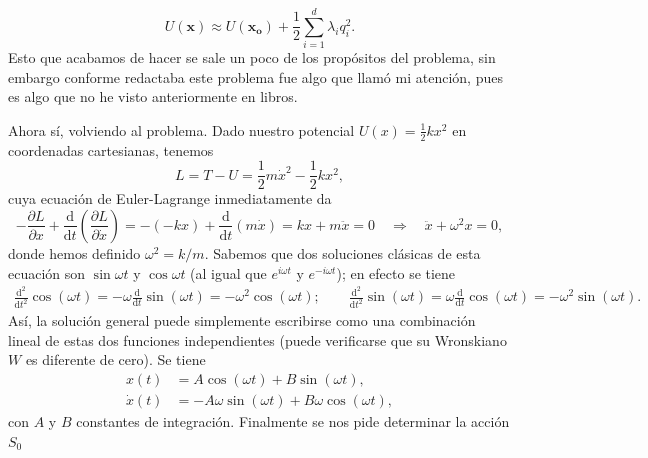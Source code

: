\documentclass{article}
\begin{document}
\begin{equation}
    U(\mathbf{x}) \approx U(\mathbf{x_o}) + \frac{1}{2}\sum_{i=1}^{d} \lambda_i q_i^2.
\end{equation}
Esto que acabamos de hacer se sale un poco de los prop\'ositos del problema, sin embargo conforme redactaba este problema fue algo que llam\'o mi atenci\'on, pues es algo que no he visto anteriormente en libros.

Ahora s\'i, volviendo al problema. Dado nuestro potencial $U(x)=\frac{1}{2}kx^2$ en coordenadas cartesianas, tenemos
\begin{equation}
    L = T-U = \frac{1}{2}m\dot{x}^2-\frac{1}{2}kx^2,
\end{equation}
cuya ecuaci\'on de Euler-Lagrange inmediatamente da
\begin{equation}
    -\frac{\partial L}{\partial x} + \frac{\mathrm{d}}{\mathrm{d}t}\left(\frac{\partial L}{\partial \dot{x}}\right) = -\left(-kx\right)+\frac{\mathrm{d}}{\mathrm{d}t}\left(m\dot{x}\right) = kx+m\ddot{x} = 0 \quad\Rightarrow\quad \ddot{x}+\omega^2x=0,
\end{equation}
donde hemos definido $\omega^2=k/m$. Sabemos que dos soluciones cl\'asicas de esta ecuaci\'on son $\sin\omega t$ y $\cos\omega t$ (al igual que $e^{i\omega t}$ y $e^{-i\omega t}$); en efecto se tiene
\begin{align}
    \frac{\mathrm{d^2}}{\mathrm{d}t^2}\cos(\omega t) = -\omega \frac{\mathrm{d}}{\mathrm{d}t}\sin(\omega t) = -\omega^2 \cos(\omega t); \qquad
    \frac{\mathrm{d^2}}{\mathrm{d}t^2}\sin(\omega t) = \omega \frac{\mathrm{d}}{\mathrm{d}t}\cos(\omega t) = -\omega^2 \sin(\omega t).
\end{align}
As\'i, la  soluci\'on general puede simplemente escribirse como una combinaci\'on lineal de estas dos funciones independientes (puede verificarse que su Wronskiano $W$ es diferente de cero). Se tiene
\begin{align}
    x(t) &= A\cos(\omega t) + B\sin(\omega t), \\
    \dot{x}(t) &= -A\omega \sin(\omega t) + B\omega \cos(\omega t),
\end{align}
con $A$ y $B$ constantes de integraci\'on. Finalmente se nos pide determinar la acci\'on $S_0$
\end{document}
